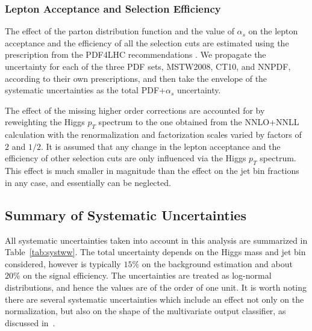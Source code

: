 \subsubsection{Lepton Acceptance and Selection Efficiency }

The effect of the parton distribution function and the value of $\alpha_{s}$
 on the lepton acceptance and the efficiency of all the selection cuts are 
estimated using the prescription from the PDF4LHC recommendations \cite{PDF4LHC}. We 
propagate the uncertainty for each of the three PDF sets, MSTW2008, CT10, and
NNPDF, according to their own prescriptions, and then take the envelope
of the systematic uncertainties as the total PDF+$\alpha_{s}$  uncertainty. 

The effect of the missing higher order corrections are accounted for by
reweighting the Higgs $p_{T}$ spectrum to the one obtained from the
NNLO+NNLL calculation with the renormalization and factorization scales
varied by factors of $2$ and $1/2$. It is assumed that any change in the
lepton acceptance and the efficiency of other selection cuts are only
influenced via the Higgs $p_{T}$ spectrum. This effect is much smaller in 
magnitude than the effect on the jet bin fractions in any case, and 
essentially can be neglected.



\subsection{Summary of Systematic Uncertainties}
All systematic uncertainties taken into account in this analysis
are summarized in Table~\ref{tab:systww}. 
The total uncertainty depends on the Higgs mass and jet bin considered,
however is typically $15\%$ on the background estimation and about $20\%$ 
on the signal efficiency. The uncertainties are treated as log-normal 
distributions, and hence the values are of the order of one unit. It is worth 
noting there are several systematic uncertainties which include an effect 
not only on the normalization, but also on the shape of the multivariate output 
classifier, as discussed in~\cite{MVASyst}.

